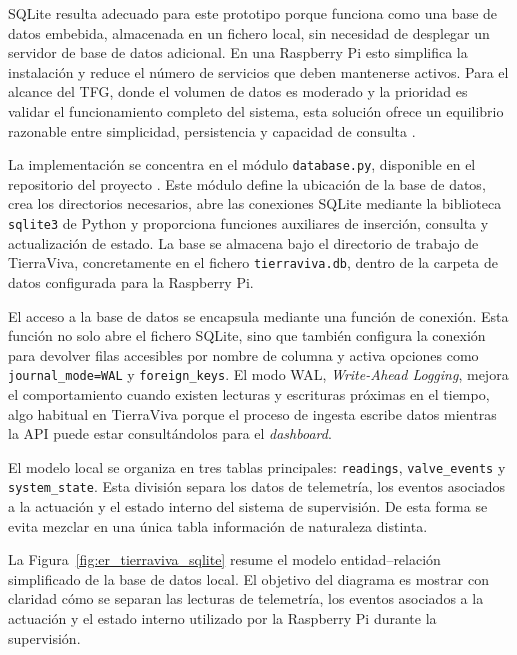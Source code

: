 SQLite resulta adecuado para este prototipo porque funciona como una base de datos embebida, almacenada en un fichero local, sin necesidad de desplegar un servidor de base de datos adicional. En una Raspberry Pi esto simplifica la instalación y reduce el número de servicios que deben mantenerse activos. Para el alcance del TFG, donde el volumen de datos es moderado y la prioridad es validar el funcionamiento completo del sistema, esta solución ofrece un equilibrio razonable entre simplicidad, persistencia y capacidad de consulta \cite{sqlite_about}.

La implementación se concentra en el módulo \texttt{database.py}, disponible en el repositorio del proyecto \cite{tierraviva_github}. Este módulo define la ubicación de la base de datos, crea los directorios necesarios, abre las conexiones SQLite mediante la biblioteca \texttt{sqlite3} de Python \cite{python_sqlite3_docs} y proporciona funciones auxiliares de inserción, consulta y actualización de estado. La base se almacena bajo el directorio de trabajo de TierraViva, concretamente en el fichero \texttt{tierraviva.db}, dentro de la carpeta de datos configurada para la Raspberry Pi.

El acceso a la base de datos se encapsula mediante una función de conexión. Esta función no solo abre el fichero SQLite, sino que también configura la conexión para devolver filas accesibles por nombre de columna y activa opciones como \texttt{journal\_mode=WAL} y \texttt{foreign\_keys}. El modo WAL, \textit{Write-Ahead Logging}, mejora el comportamiento cuando existen lecturas y escrituras próximas en el tiempo, algo habitual en TierraViva porque el proceso de ingesta escribe datos mientras la API puede estar consultándolos para el \textit{dashboard}.

El modelo local se organiza en tres tablas principales: \texttt{readings}, \texttt{valve\_events} y \texttt{system\_state}. Esta división separa los datos de telemetría, los eventos asociados a la actuación y el estado interno del sistema de supervisión. De esta forma se evita mezclar en una única tabla información de naturaleza distinta.

La Figura~\ref{fig:er_tierraviva_sqlite} resume el modelo entidad--relación simplificado de la base de datos local. El objetivo del diagrama es mostrar con claridad cómo se separan las lecturas de telemetría, los eventos asociados a la actuación y el estado interno utilizado por la Raspberry Pi durante la supervisión.

